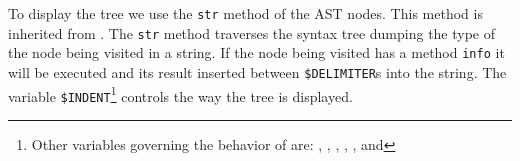 To display
the tree we use the \verb|str| method
of the AST nodes. This method is inherited from . 
The \verb|str| method traverses the syntax tree dumping the type
of the node being visited in a string. If the node being visited
has a method \verb|info| it will
be executed and its result inserted between \verb|$DELIMITER|s
into the string. The  variable 
\verb|$INDENT|\footnote{Other 
variables governing the behavior of  are:
\code{\@PREFIXES},
,
,
,
,
and
}
controls the way the tree is displayed. 

